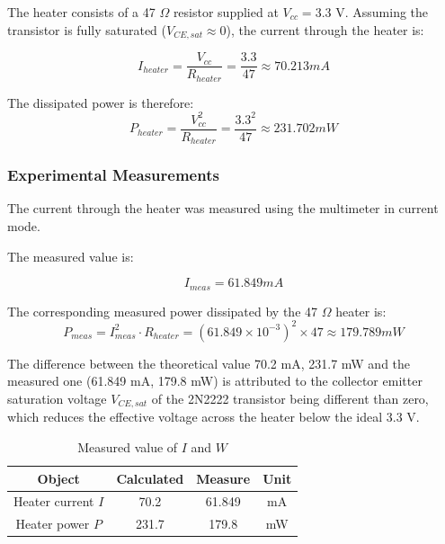 \documentclass[../main.tex]{subfiles}
\begin{document}
The heater consists of a 47 $\Omega$ resistor supplied at $V_{cc} = 3.3$ V. Assuming the transistor is fully saturated ($V_{CE,sat} \approx 0$), the current through the heater is:

\begin{equation*}
    I_{heater} = \frac{V_{cc}}{R_{heater}} = \frac{3.3}{47} \approx 70.213 \unit{mA}    
\end{equation*}

The dissipated power is therefore:\\

\begin{equation*}
    P_{heater} = \frac{V_{cc}^{2}}{R_{heater}} = \frac{3.3^{2}}{47} \approx 231.702 \unit{mW}   
\end{equation*}


\subsubsection*{Experimental Measurements}

The current through the heater was measured using the multimeter in current mode. 

The measured value is:

\begin{equation*}
    I_{meas} = 61.849 \unit{mA}
\end{equation*}

The corresponding measured power dissipated by the 47 $\Omega$ heater is:\\

\begin{equation*}
    P_{meas} = I_{meas}^{2} \cdot R_{heater} = (61.849 \times 10^{-3})^{2} \times 47 \approx 179.789\unit{mW}
\end{equation*}


The difference between the theoretical value 70.2 mA, 231.7 mW and the measured one (61.849 mA, 179.8 mW) is attributed  to the collector emitter saturation voltage $V_{CE,sat}$ of the 2N2222 transistor being different than zero, which reduces the effective voltage across the heater below the ideal 3.3 V.\\

\begin{table}[h!]
\centering	

\begin{tabular}{cccc}
\textbf{Object} & \textbf{Calculated} & \textbf{Measure} & \textbf{Unit}\\
\hline
Heater current $I$  & 70.2  & 61.849 & mA \\
\hline
Heater power $P$  & 231.7 & 179.8 & mW \\

\end{tabular}
\caption*{Measured value of $I$ and $W$}
\end{table}
\end{document}
